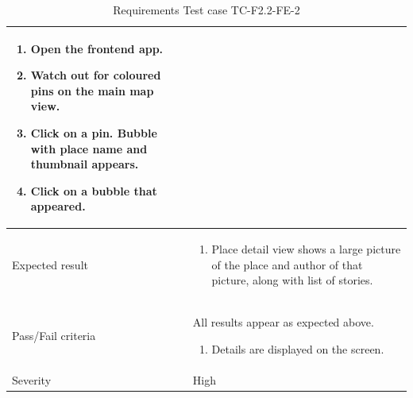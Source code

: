\documentclass[11pt]{book}
\begin{document}
\begin{table}
\begin{tabular}{| p{3cm} | p{9.5cm} |}
                            \begin{enumerate}
                              \item Open the frontend app.
                              \item Watch out for coloured pins on the main map view.
                              \item Click on a pin. Bubble with place name and thumbnail appears.
                              \item Click on a bubble that appeared.
                            \end{enumerate} \\ \hline 
    Expected result       & \begin{enumerate}
                              \item Place detail view shows a large picture of the place and author of that picture, along with list of stories.
                            \end{enumerate} \\ \hline 
    Pass/Fail criteria    & All results appear as expected above.
                            \begin{enumerate}
                              \item Details are displayed on the screen.
                            \end{enumerate} \\ \hline 
    Severity              & High \\ \hline 
  \end{tabular}
  \caption{Requirements Test case TC-F2.2-FE-2}
  \label{tab:TCF2.2FE2}
\end{table}
\end{document}
